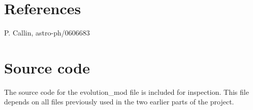 \documentclass[a4paper]{report}
\begin{document}
\section{References}
\begin{enumerate}[label= {[}\arabic*{]} ]
 \item P. Callin, astro-ph/0606683
\end{enumerate}

\onecolumn 
\section{Source code}\label{sec:files}
The source code for the evolution\_mod file is included for inspection. This file depends on all files previously used in the two earlier parts of the project.
\end{document}
